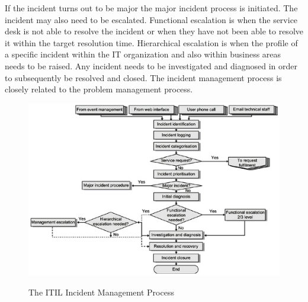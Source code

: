 If the incident turns out to be major the major incident process is initiated. The incident may also need to be escalated. Functional escalation is when the service desk is not able to resolve the incident or when they have not been able to resolve it within the target resolution time. Hierarchical escalation is when the profile of a specific incident within the IT organization and also within business areas needs to be raised. Any incident needs to be investigated and diagnosed in order to subsequently be resolved and closed. The incident management process is closely related to the problem management process.

\begin{figure}
\centering
\scalebox{0.48}
{\includegraphics{ITILIncidentManagement.png}}
\caption[The ITIL Incident Management Process]{The ITIL Incident Management Process \cite{itilbok}} 
\label{fig:ITILIncidentManagement}
\end{figure}


